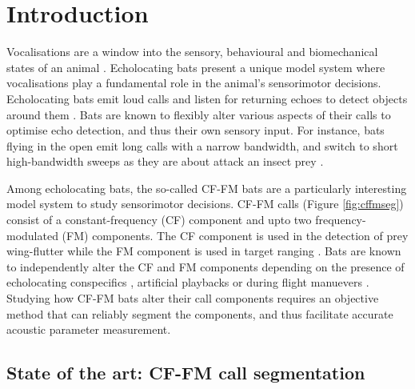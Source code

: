 \documentclass[
]{book}
\begin{document}
\newpage

\hypertarget{introduction}{%
\section{Introduction}\label{introduction}}

Vocalisations are a window into the sensory, behavioural and biomechanical states of an animal \citep{green1979analysis, metzner2016ultrasound}. Echolocating bats present a unique model system where vocalisations play a fundamental role in the animal's sensorimotor decisions. Echolocating bats emit loud calls and listen for returning echoes to detect objects around them \citep{griffin1958listening}. Bats are known to flexibly alter various aspects of their calls to optimise echo detection, and thus their own sensory input. For instance, bats flying in the open emit long calls with a narrow bandwidth, and switch to short high-bandwidth sweeps as they are about attack an insect prey \citep{fenton2013questions}.

Among echolocating bats, the so-called CF-FM bats are a particularly interesting model system to study sensorimotor decisions. CF-FM calls (Figure \ref{fig:cffmseg}) consist of a constant-frequency (CF) component and upto two frequency-modulated (FM) components. The CF component is used in the detection of prey wing-flutter \citep{schnitzler2011auditory} while the FM component is used in target ranging \citep{tian1997echolocation}. Bats are known to independently alter the CF and FM components depending on the presence of echolocating conspecifics \citep{fawcett2015echolocation}, artificial playbacks \citep{lu2020echolocating, hage2013ambient, hage2014ambient} or during flight manuevers \citep{tian1997echolocation, schoeppler2018precise}. Studying how CF-FM bats alter their call components requires an objective method that can reliably segment the components, and thus facilitate accurate acoustic parameter measurement.

\hypertarget{state-of-the-art-cf-fm-call-segmentation}{%
\subsection{State of the art: CF-FM call segmentation}\label{state-of-the-art-cf-fm-call-segmentation}}
\end{document}
